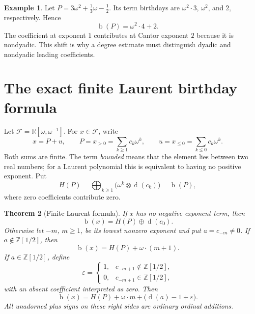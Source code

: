 \documentclass[11pt,letterpaper]{article}
\numberwithin{equation}{section}
\newtheorem{theorem}{Theorem}[section]
\theoremstyle{definition}
\newtheorem{example}[theorem]{Example}
\theoremstyle{remark}
\newcommand{\R}{\mathbb{R}}
\newcommand{\D}{\mathbb{Z}[1/2]}
\newcommand{\Fin}{\mathcal{F}}
\newcommand{\bd}{\operatorname{b}}
\newcommand{\rd}{\operatorname{d}}
\newcommand{\ns}{\mathbin{\oplus}}
\newcommand{\np}{\mathbin{\otimes}}
\newcommand{\bigns}{\mathop{\bigoplus}}
\begin{document}
\begin{example}
Let $P=3\omega^2+\tfrac13\omega-\tfrac12$. Its term birthdays are
$\omega^2\cdot3$, $\omega^2$, and $2$, respectively. Hence
\[
 \bd(P)=\omega^2\cdot4+2.
\]
The coefficient at exponent $1$ contributes at Cantor exponent $2$ because it
is nondyadic. This shift is why a degree estimate must distinguish dyadic and
nondyadic leading coefficients.
\end{example}

\section{The exact finite Laurent birthday formula}
\label{sec:finiteformula}
Let $\Fin=\R[\omega,\omega^{-1}]$. For $x\in\Fin$, write
\[
 x=P+u,
 \qquad P=x_{>0}=\sum_{k\geq1}c_k\omega^k,
 \qquad u=x_{\leq0}=\sum_{k\leq0}c_k\omega^k.
\]
Both sums are finite. The term \emph{bounded} means that the element lies
between two real numbers; for a Laurent polynomial this is equivalent to
having no positive exponent. Put
\begin{equation}\label{eq:H}
 H(P)=\bigns_{k\geq1}\bigl(\omega^k\np\rd(c_k)\bigr)=\bd(P),
\end{equation}
where zero coefficients contribute zero.

\begin{theorem}[Finite Laurent formula]\label{thm:finiteformula}
If $x$ has no negative-exponent term, then
\[
 \bd(x)=H(P)\ns\rd(c_0).
\]
Otherwise let $-m$, $m\geq1$, be its lowest nonzero exponent and put
$a=c_{-m}\neq0$. If $a\notin\D$, then
\begin{equation}\label{eq:finiteND}
 \bd(x)=H(P)+\omega\cdot(m+1).
\end{equation}
If $a\in\D$, define
\[
 \varepsilon=
 \begin{cases}
  1,&c_{-m+1}\notin\D,\\
  0,&c_{-m+1}\in\D,
 \end{cases}
\]
with an absent coefficient interpreted as zero. Then
\begin{equation}\label{eq:finiteD}
 \bd(x)=H(P)+\omega\cdot m+
             \bigl(\rd(a)-1+\varepsilon\bigr).
\end{equation}
All unadorned plus signs on these right sides are ordinary ordinal additions.
\end{theorem}
\end{document}
